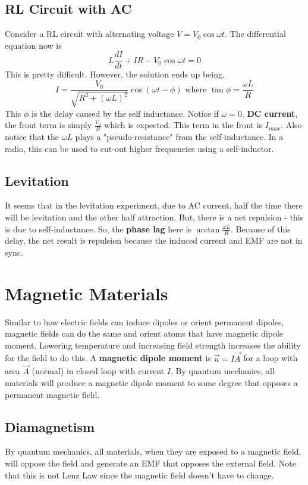 \documentclass{article}
\begin{document}
\subsection{RL Circuit with AC}
Consider a RL circuit with alternating voltage $V=V_{0}\cos\omega t$. The differential equation now is
$$L\frac{dI}{dt}+IR-V_{0}\cos\omega t=0$$
This is pretty difficult. However, the solution ends up being,
$$I=\frac{V_0}{\sqrt{R^{2}+(\omega L)^{2}}}\cos(\omega t-\phi)\text{ where }\tan\phi=\frac{\omega L}{R}$$
This $\phi$ is the delay caused by the self inductance. Notice if $\omega=0$, \textbf{DC current}, 
the front term is simply $\frac{V_{0}}{R}$ which is expected. This term in the front is $I_{max}$.
Also notice that the $\omega L$ plays a "pseudo-resistance" from the self-inductance. In a radio, 
this can be used to cut-out higher frequencies using a self-inductor.

\subsection{Levitation}
It seems that in the levitation experiment, due to AC current, half the time there will be levitation and the other half
attraction. But, there is a net repulsion - this is due to self-inductance. So, the \textbf{phase lag} here 
is $\arctan \frac{\omega L}{R}$. Because of this delay, the net result is repulsion because the induced current and EMF are not in sync.

\section{Magnetic Materials}
Similar to how electric fields can induce dipoles or orient permanent dipoles,
magnetic fields can do the same and orient atoms that have magnetic dipole moment.
Lowering temperature and increasing field strength increases the ability for the field to do this.
A \textbf{magnetic dipole moment} is $\vec{u}=I\vec{A}$ for a loop with area $\vec{A}$ (normal) 
in closed loop with current $I$. By quantum mechanics, all materials will produce a magnetic dipole 
moment to some degree that opposes a permanent magnetic field.

\subsection{Diamagnetism}
By quantum mechanics, all materials, when they are exposed to a magnetic field, will oppose the field and generate an EMF that opposes the external field.
Note that this is not Lenz Law since the magnetic field doesn't have to change.
\end{document}
